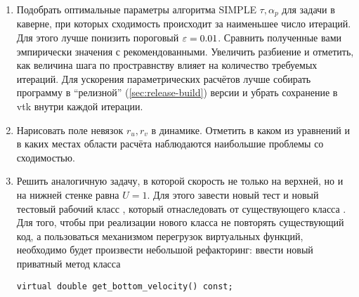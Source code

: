 \begin{enumerate}

\item 
Подобрать оптимальные параметры алгоритма SIMPLE $\tau, \alpha_p$ для задачи в каверне,
при которых сходимость происходит за наименьшее число итераций.
Для этого лучше понизить пороговый $\varepsilon=0.01$.
Сравнить полученные вами эмпирически значения с рекомендованными.
Увеличить разбиение и отметить, как величина шага по простравнству влияет на количество
требуемых итераций.
Для ускорения параметрических расчётов лучше собирать программу в ``релизной'' (\ref{sec:release-build}) 
версии и убрать сохранение в vtk внутри каждой итерации.

\item
Нарисовать поле невязок $r_u, r_v$ в динамике. Отметить в каком из уравнений и в каких местах области расчёта
наблюдаются наибольшие проблемы со сходимостью.

\item
Решить аналогичную задачу, в которой скорость не только на верхней, но и на
нижней стенке равна $U=1$.
Для этого завести новый тест  и новый тестовый
рабочий класс , который
отнаследовать от существующего класса .
Для того, чтобы при реализации нового класса не повторять существующий код, а пользоваться механизмом
перегрузок виртуальных функций, необходимо будет
произвести небольшой рефакторинг:
ввести новый приватный метод класса 
\begin{verbatim}
virtual double get_bottom_velocity() const;
\end{verbatim}

\end{enumerate}

